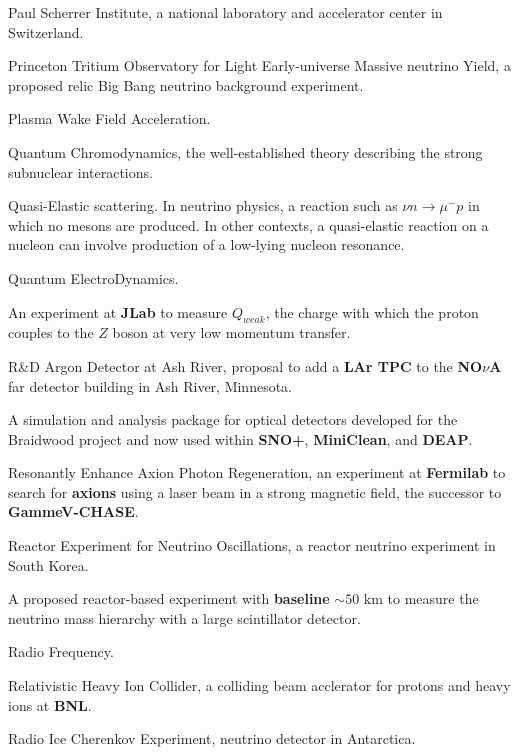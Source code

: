  Paul Scherrer Institute, a national laboratory and
accelerator center in Switzerland.

 Princeton Tritium Observatory for Light Early-universe
Massive neutrino Yield, a proposed relic Big Bang neutrino background
experiment.

  Plasma Wake Field Acceleration.


 Quantum Chromodynamics, the well-established theory
describing the strong subnuclear interactions.

 Quasi-Elastic scattering.  In neutrino physics, a
reaction 
such as  $\nu n \to \mu^- p$ in which no mesons are produced.  In 
other contexts, a quasi-elastic reaction on a nucleon 
can involve production of a low-lying nucleon resonance.

  Quantum ElectroDynamics.


   An experiment
at {\bf JLab}  to 
measure $Q_{weak}$,  the charge with which the proton couples to
the  $Z$ boson at very low momentum transfer.


 R\&D Argon Detector at Ash River, proposal to add
a {\bf LAr TPC} to the {\bf NO\boldmath$\nu$A} far detector building in Ash River, Minnesota.

  A simulation and analysis package for optical detectors developed 
   for the Braidwood project and now used within {\bf SNO+}, {\bf
     MiniClean}, and {\bf DEAP}.

  Resonantly Enhance Axion Photon Regeneration, an experiment at {\bf Fermilab} to search 
for {\bf axions}  using a laser beam in a strong magnetic field, the
successor to {\bf GammeV-CHASE}.


 Reactor Experiment for Neutrino Oscillations, a reactor
neutrino experiment in South Korea.

 A proposed reactor-based experiment with {\bf baseline} $\sim 50$
km to measure the neutrino mass hierarchy with a large scintillator
detector.

  Radio Frequency.

 Relativistic Heavy Ion Collider, a colliding beam 
acclerator for protons and heavy ions at {\bf BNL}. 



  Radio Ice Cherenkov Experiment, neutrino detector in Antarctica.

